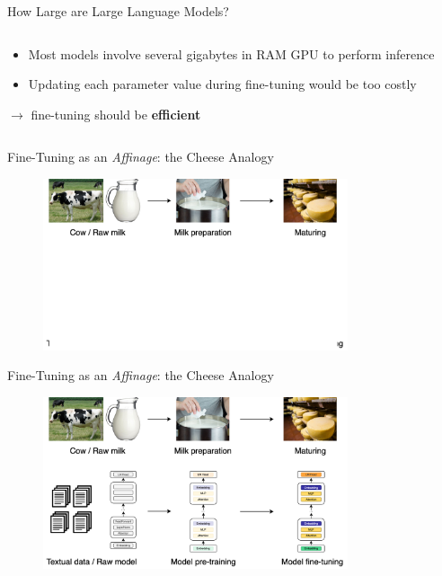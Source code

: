 \documentclass[11pt,aspectratio=169]{beamer}
\begin{document}
\begin{frame}{How Large are Large Language Models?}
\begin{columns}
\begin{column}{0.4\linewidth}
            \vspace{0.5cm}
            \begin{itemize}
                \item Most models involve several gigabytes in RAM GPU to perform inference
                \item Updating each parameter value during fine-tuning would be too costly
            \end{itemize}
            \vspace{0.2cm}
            $\longrightarrow$ fine-tuning should be \textbf{efficient}
        \end{column}
    \end{columns}
    
    
\end{frame}

\begin{frame}{Fine-Tuning as an \textsl{Affinage}: the Cheese Analogy}
    \begin{figure}
        \centering
        \includegraphics[width=0.8\textwidth]{pretrain_finetune_1.png}
    \end{figure}
\end{frame}

\begin{frame}{Fine-Tuning as an \textsl{Affinage}: the Cheese Analogy}
    \begin{figure}
        \centering
        \includegraphics[width=0.8\textwidth]{pretrain_finetune_2.png}
    \end{figure}
\end{frame}
\end{document}
